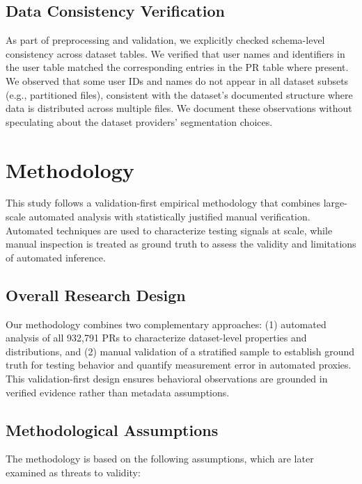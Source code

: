 \documentclass[conference]{IEEEtran}
\begin{document}
\subsection{Data Consistency Verification}

As part of preprocessing and validation, we explicitly checked schema-level consistency across dataset tables. We verified that user names and identifiers in the user table matched the corresponding entries in the PR table where present. We observed that some user IDs and names do not appear in all dataset subsets (e.g., partitioned files), consistent with the dataset's documented structure where data is distributed across multiple files. We document these observations without speculating about the dataset providers' segmentation choices.

\section{Methodology}

This study follows a validation-first empirical methodology that combines large-scale automated analysis with statistically justified manual verification. Automated techniques are used to characterize testing signals at scale, while manual inspection is treated as ground truth to assess the validity and limitations of automated inference.

\subsection{Overall Research Design}

Our methodology combines two complementary approaches: (1) automated analysis of all 932,791 PRs to characterize dataset-level properties and distributions, and (2) manual validation of a stratified sample to establish ground truth for testing behavior and quantify measurement error in automated proxies. This validation-first design ensures behavioral observations are grounded in verified evidence rather than metadata assumptions.

\subsection{Methodological Assumptions}

The methodology is based on the following assumptions, which are later examined as threats to validity:
\end{document}
